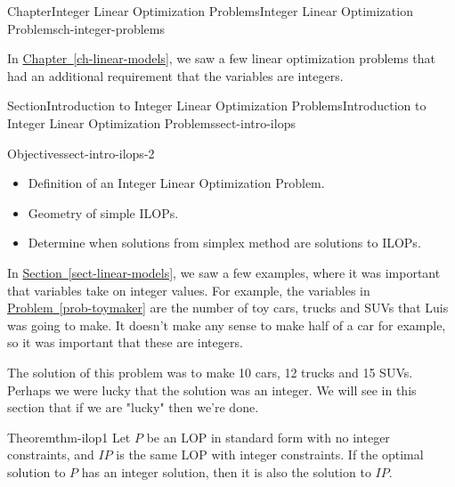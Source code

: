 \documentclass[oneside,10pt,]{book}
\newcommand{\xreffont}{\relax}
\numberwithin{equation}{section}
\begin{document}
\typeout{************************************************}
%
\begin{chapterptx}{Chapter}{Integer Linear Optimization Problems}{}{Integer Linear Optimization Problems}{}{}{ch-integer-problems}
\renewcommand*{\chaptername}{Chapter}
\begin{introduction}{}%
In \hyperref[ch-linear-models]{Chapter~{\xreffont\ref{ch-linear-models}}}, we saw a few linear optimization problems that had an additional requirement that the variables are integers.%
\end{introduction}%
%
%
\typeout{************************************************}
\typeout{************************************************}
%
\begin{sectionptx}{Section}{Introduction to Integer Linear Optimization Problems}{}{Introduction to Integer Linear Optimization Problems}{}{}{sect-intro-ilops}
\begin{objectives}{Objectives}{sect-intro-ilops-2}
%
\begin{itemize}[label=\textbullet]
\item{}Definition of an Integer Linear Optimization Problem.%
\item{}Geometry of simple ILOPs.%
\item{}Determine when solutions from simplex method are solutions to ILOPs.%
\end{itemize}
\end{objectives}
In \hyperref[sect-linear-models]{Section~{\xreffont\ref{sect-linear-models}}}, we saw a few examples, where it was important that variables take on integer values. For example, the variables in \hyperref[prob-toymaker]{Problem~{\xreffont\ref{prob-toymaker}}} are the number of toy cars, trucks and SUVs that Luis was going to make. It doesn't make any sense to make half of a car for example, so it was important that these are integers.%
\par
The solution of this problem was to make 10 cars, 12 trucks and 15 SUVs. Perhaps we were lucky that the solution was an integer. We will see in this section that if we are "lucky" then we're done.%
\begin{theorem}{Theorem}{}{}{thm-ilop1}%
Let \(P\) be an LOP in standard form with no integer constraints, and \(IP\) is the same LOP with integer constraints. If the optimal solution to \(P\) has an integer solution, then it is also the solution to \(IP\).%
\end{theorem}

\end{sectionptx}
\end{chapterptx}
\end{document}
